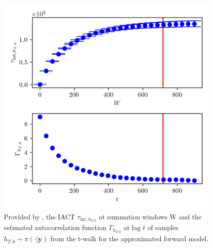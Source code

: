 \begin{figure}[ht!]
	\centering
	\includegraphics{UwerrTauIntTWalk16.png}
	\caption[IACT and autocorrelation function of samples $h_{T,6} \sim \pi(\cdot|\bm{y})$, for approximated model.]{Provided by \cite{drikHesse}, the IACT $\tau_{\text{int},h_{T,6}}$ at summation windows W and the estimated autocorrelation function $\Gamma_{h_{T,6}}$ at lag $t$ of samples $h_{T,6} \sim \pi( \cdot| \bm{y})$ from the t-walk for the approximated forward model.}
	\label{fig:TWalkIATC17}
\end{figure}

